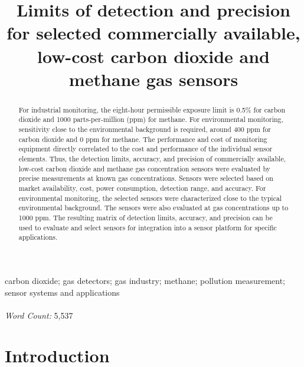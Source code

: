 \documentclass[times]{joehreview}
\begin{document}
	
	\begin{frontmatter}
		\title{Limits of detection and precision for selected commercially available, low-cost carbon dioxide and methane gas sensors}
		\begin{abstract} 
			
			For industrial monitoring, the eight-hour permissible exposure limit is 0.5\% for carbon dioxide and 1000 parts-per-million (ppm) for methane.  For environmental monitoring, sensitivity close to the environmental background is required, around 400 ppm for carbon dioxide and 0 ppm for methane.  The performance and cost of monitoring equipment directly correlated to the cost and performance of the individual sensor elements.  Thus, the detection limits, accuracy, and precision of commercially available, low-cost carbon dioxide and methane gas concentration sensors were evaluated by precise measurements at known gas concentrations.  Sensors were selected based on market availability, cost, power consumption, detection range, and accuracy.  For environmental monitoring, the selected sensors were characterized close to the typical environmental background.  The sensors were also evaluated at gas concentrations up to 1000 ppm.  The resulting matrix of detection limits, accuracy, and precision can be used to evaluate and select sensors for integration into a sensor platform for specific applications.  
			
		\end{abstract}
		
		\begin{keyword}
			carbon dioxide; gas detectors; gas industry; methane; pollution measurement; sensor systems and applications
			\\~\\
			\textit{Word Count:} 5,537
		\end{keyword}
		
	\end{frontmatter}
	
	
	\section*{Introduction}
	\label{sec:intro}
	
\end{document}
